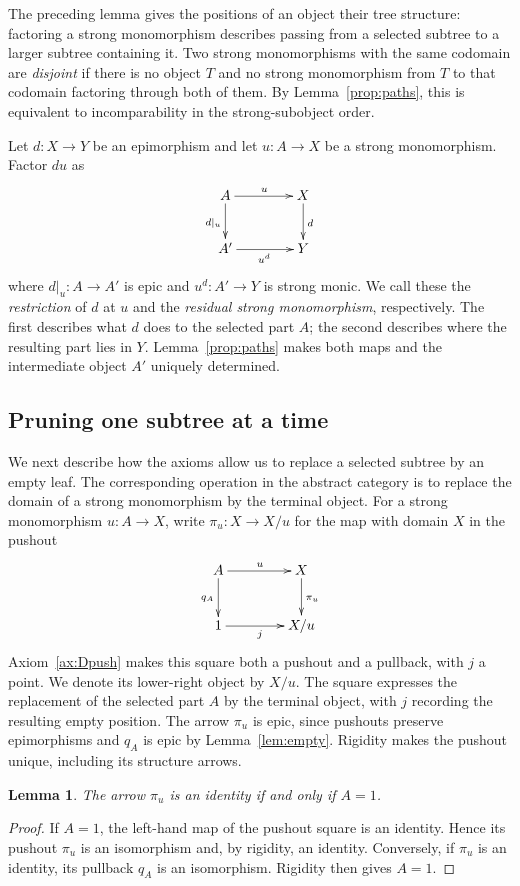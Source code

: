 \documentclass[11pt,a4paper]{article}
\theoremstyle{plain}
\newtheorem{lemma}[theorem]{Lemma}
\theoremstyle{definition}
\theoremstyle{remark}
\newcommand{\one}{1}
\begin{document}
The preceding lemma gives the positions of an object their tree
structure: factoring a strong monomorphism describes passing from
a selected subtree to a larger subtree containing it. Two strong
monomorphisms with the same codomain are \emph{disjoint}
if there is no object $T$ and no strong monomorphism from $T$ to
that codomain factoring through both of them. By
Lemma~\ref{prop:paths}, this is equivalent to incomparability
in the strong-subobject order.

Let $d:X\to Y$ be an epimorphism and let $u:A\to X$ be a strong
monomorphism. Factor $du$ as
\begin{equation}\label{eq:residual}
 \vcenter{\xymatrix@C=4em@R=2.5em{
A\ar[r]^u\ar[d]_{d|_u}&X\ar[d]^d\\
A'\ar[r]_{u^d}&Y
 }}
\end{equation}
where $d|_u:A\to A'$ is epic and $u^d:A'\to Y$ is strong monic.
We call these the \emph{restriction} of $d$ at $u$ and the
\emph{residual strong monomorphism}, respectively. The first describes
what $d$ does to the selected part $A$; the second describes where
the resulting part lies in $Y$. Lemma~\ref{prop:paths} makes both
maps and the intermediate object $A'$ uniquely determined.


\subsection{Pruning one subtree at a time}\label{sec:single-pruning}
We next describe how the axioms allow us to replace a selected
subtree by an empty leaf. The corresponding operation in the
abstract category is to replace the domain of a strong
monomorphism by the terminal object. For a strong monomorphism
$u:A\to X$, write $\pi_u:X\to X/u$
for the map with domain $X$ in the pushout
\[
\xymatrix@C=4em@R=2.5em{
A \ar[r]^{u} \ar[d]_{q_A} & X \ar[d]^{\pi_u} \\
 \one \ar[r]_{j} & X/u
}
\]
Axiom~\ref{ax:Dpush} makes this square both a pushout and a
pullback, with $j$ a point. We denote its lower-right object by
$X/u$. The square expresses the replacement of the selected part
$A$ by the terminal object, with $j$ recording the resulting
empty position. The arrow $\pi_u$ is epic, since pushouts preserve epimorphisms and
$q_A$ is epic by Lemma~\ref{lem:empty}. Rigidity makes the pushout
unique, including its structure arrows.

\begin{lemma}\label{lem:pushoutidentity}
The arrow $\pi_u$ is an identity if and only if $A=\one$.
\end{lemma}
\begin{proof}
If $A=\one$, the left-hand map of the pushout square is an
identity. Hence its pushout $\pi_u$ is an isomorphism and, by
rigidity, an identity. Conversely, if $\pi_u$ is an identity,
its pullback $q_A$ is an isomorphism. Rigidity then gives
$A=\one$.
\end{proof}
\end{document}
